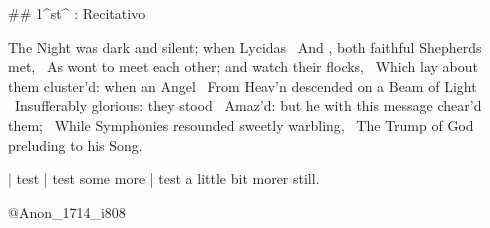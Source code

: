 \newpage
{}

## 1^st^ \mvmt: Recitativo

\beginnumbering
\pstart
The Night was dark and silent; when Lycidas  \
And , both faithful Shepherds met,  \
As wont to meet each other; and watch their flocks,  \
Which lay about them cluster’d: when an Angel  \
From Heav’n descended on a Beam of Light  \
Insufferably glorious: they stood  \
Amaz’d: but he with this message chear’d them;  \
While Symphonies resounded sweetly warbling,  \
The Trump of God preluding to his Song.
\pend
\endnumbering

| test
| test some more
| test a little bit morer still.

\vspace*{\stretch{1}}
@Anon_1714_i808
